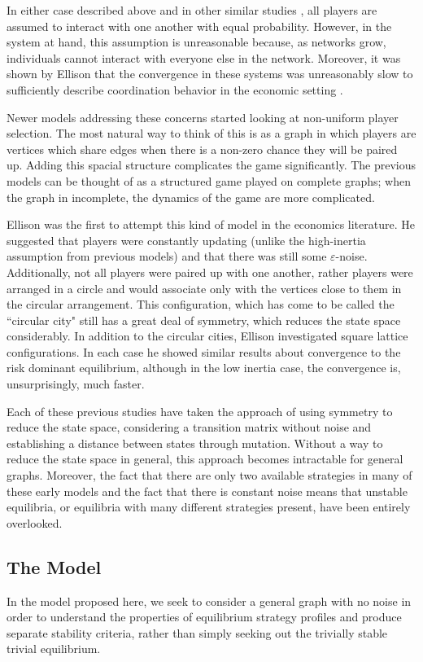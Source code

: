 \documentclass[]{article}
\begin{document}
		In either case described above and in other similar studies \cite{Kandori1995}, all players are assumed to interact with one another with equal probability. However, in the system at hand, this assumption is unreasonable because, as networks grow, individuals cannot interact with everyone else in the network. Moreover, it was shown by Ellison that the convergence in these systems was unreasonably slow to sufficiently describe coordination behavior in the economic setting \cite{Ellison2000}.
		
		Newer models addressing these concerns started looking at non-uniform player selection. The most natural way to think of this is as a graph in which players are vertices which share edges when there is a non-zero chance they will be paired up. Adding this spacial structure complicates the game significantly. The previous models can be thought of as a structured game played on complete graphs; when the graph in incomplete, the dynamics of the game are more complicated. 
		
		Ellison was the first to attempt this kind of model in the economics literature. He suggested that players were constantly updating (unlike the high-inertia assumption from previous models) and that there was still some $\varepsilon$-noise. Additionally, not all players were paired up with one another, rather players were arranged in a circle and would associate only with the vertices close to them in the circular arrangement\cite{Ellison1993}. This configuration, which has come to be called the ``circular city" \cite{Weidenholzer} still has a great deal of symmetry, which reduces the state space considerably. In addition to the circular cities, Ellison investigated square lattice configurations. In each case he showed similar results about convergence to the risk dominant equilibrium, although in the low inertia case, the convergence is, unsurprisingly, much faster. 
		
		Each of these previous studies have taken the approach of using symmetry to reduce the state space, considering a transition matrix without noise and establishing a distance between states through mutation. Without a way to reduce the state space in general, this approach becomes intractable for general graphs. Moreover, the fact that there are only two available strategies in many of these early models and the fact that there is constant noise means that unstable equilibria, or equilibria with many different strategies present, have been entirely overlooked. 

		\subsection{The Model}\label{themodel}
		In the model proposed here, we seek to consider a general graph with no noise in order to understand the properties of equilibrium strategy profiles and produce separate stability criteria, rather than simply seeking out the trivially stable trivial equilibrium. 
		
\end{document}
